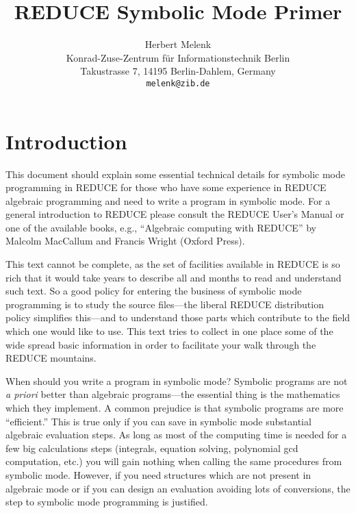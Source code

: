 \documentclass[11pt]{article}
\title{REDUCE Symbolic Mode Primer}
\author{
Herbert Melenk\\
Konrad-Zuse-Zentrum
f\"ur Informationstechnik Berlin\\
Takustrasse 7,
14195 Berlin-Dahlem,
Germany\\
\texttt{melenk@zib.de}}
\newcommand{\reduce}{\small REDUCE}
\begin{document}
\maketitle

\section{Introduction}

This document should explain some essential technical details for
symbolic mode programming in {\reduce} for those who
have some experience in {\reduce} algebraic programming
and need to write a program in symbolic mode. For a general
introduction to {\reduce} please consult the {\reduce} User's
Manual or one of the available books, e.g.,  ``Algebraic
computing with REDUCE'' by Malcolm MacCallum and Francis
Wright (Oxford Press).

This text cannot be complete, as the set of facilities
available in {\reduce} is so rich that it would take years
to describe all and months to read and understand such text.
So a good policy for entering the business of symbolic mode
programming is to study the source files---the
liberal {\reduce} distribution policy simplifies this---and
to understand those parts which contribute to the
field which one would like to use. This text tries to
collect in one place some of the wide spread basic information
in order to facilitate your walk through the {\reduce} mountains.

When should you write a program in symbolic mode?
Symbolic programs are not \textit{a priori} better than algebraic
programs---the essential thing is the mathematics which they
implement. A common prejudice is that symbolic programs
are more ``efficient.'' This is true only if you can
save in symbolic mode substantial algebraic evaluation
steps. As long as most of the
computing time is needed for a few big calculations steps
(integrals, equation solving, polynomial gcd computation, etc.)
you will gain nothing when calling the same procedures
from symbolic mode. However, if you need structures
which are not present in algebraic mode or if you
can design an evaluation avoiding lots of conversions,
the step to symbolic mode programming is justified.
\end{document}

